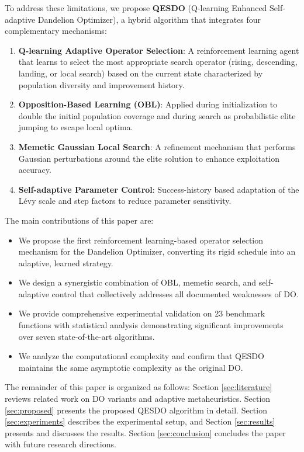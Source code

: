\documentclass[preprint,12pt]{elsarticle}
\begin{document}
To address these limitations, we propose \textbf{QESDO} (Q-learning Enhanced Self-adaptive Dandelion Optimizer), a hybrid algorithm that integrates four complementary mechanisms:

\begin{enumerate}
    \item \textbf{Q-learning Adaptive Operator Selection}: A reinforcement learning agent that learns to select the most appropriate search operator (rising, descending, landing, or local search) based on the current state characterized by population diversity and improvement history.
    \item \textbf{Opposition-Based Learning (OBL)}: Applied during initialization to double the initial population coverage and during search as probabilistic elite jumping to escape local optima.
    \item \textbf{Memetic Gaussian Local Search}: A refinement mechanism that performs Gaussian perturbations around the elite solution to enhance exploitation accuracy.
    \item \textbf{Self-adaptive Parameter Control}: Success-history based adaptation of the Lévy scale and step factors to reduce parameter sensitivity.
\end{enumerate}

The main contributions of this paper are:

\begin{itemize}
    \item We propose the first reinforcement learning-based operator selection mechanism for the Dandelion Optimizer, converting its rigid schedule into an adaptive, learned strategy.
    \item We design a synergistic combination of OBL, memetic search, and self-adaptive control that collectively addresses all documented weaknesses of DO.
    \item We provide comprehensive experimental validation on 23 benchmark functions with statistical analysis demonstrating significant improvements over seven state-of-the-art algorithms.
    \item We analyze the computational complexity and confirm that QESDO maintains the same asymptotic complexity as the original DO.
\end{itemize}

The remainder of this paper is organized as follows: Section \ref{sec:literature} reviews related work on DO variants and adaptive metaheuristics. Section \ref{sec:proposed} presents the proposed QESDO algorithm in detail. Section \ref{sec:experiments} describes the experimental setup, and Section \ref{sec:results} presents and discusses the results. Section \ref{sec:conclusion} concludes the paper with future research directions.
\end{document}

